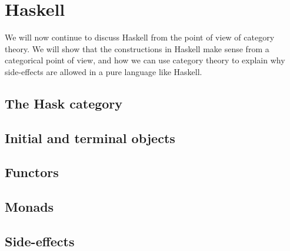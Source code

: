 \documentclass[../thesis.tex]{subfiles}
\begin{document}
\chapter{Haskell}

We will now continue to discuss Haskell from the point of view of category theory.
We will show that the constructions in Haskell make sense from a categorical point of view, and how we can use category theory to explain why side-effects are allowed in a pure language like Haskell.

\section{The Hask category}

\section{Initial and terminal objects}

\section{Functors}

\section{Monads}

\section{Side-effects}
\end{document}
